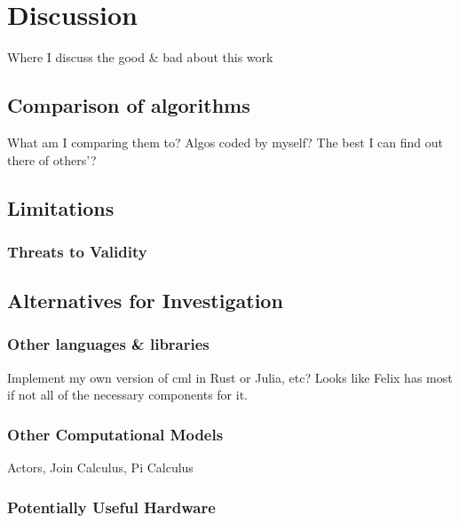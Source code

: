\chapter{Discussion}

Where I discuss the good \& bad about this work

\section{Comparison of  algorithms}

What am I comparing them to?  Algos coded by myself?  The best I can find out there of others'?

\subsection{}

\subsection{}

\section{Limitations}

\subsection{Threats to Validity}

\section{Alternatives for Investigation}

\subsection{Other languages \& libraries}
Implement my own version of \gls{cml} in Rust or Julia, etc?  Looks like Felix has most if not all of the necessary components for it.

\subsection{Other Computational Models}
Actors, Join Calculus, Pi Calculus

\subsection{Potentially Useful Hardware}

